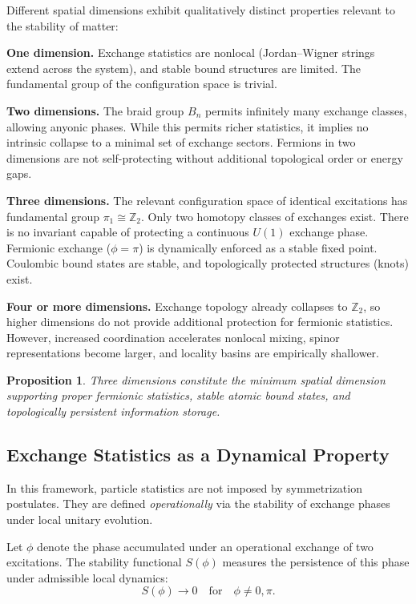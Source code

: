 \documentclass[11pt]{article}
\newtheorem{proposition}{Proposition}
\begin{document}
Different spatial dimensions exhibit qualitatively distinct properties relevant to the stability of matter:

\textbf{One dimension.} Exchange statistics are nonlocal (Jordan--Wigner strings extend across the system), and stable bound structures are limited. The fundamental group of the configuration space is trivial.

\textbf{Two dimensions.} The braid group $B_n$ permits infinitely many exchange classes, allowing anyonic phases. While this permits richer statistics, it implies no intrinsic collapse to a minimal set of exchange sectors. Fermions in two dimensions are not self-protecting without additional topological order or energy gaps.

\textbf{Three dimensions.} The relevant configuration space of identical excitations has fundamental group $\pi_1 \cong \mathbb{Z}_2$. Only two homotopy classes of exchanges exist. There is no invariant capable of protecting a continuous $U(1)$ exchange phase. Fermionic exchange ($\phi = \pi$) is dynamically enforced as a stable fixed point. Coulombic bound states are stable, and topologically protected structures (knots) exist.

\textbf{Four or more dimensions.} Exchange topology already collapses to $\mathbb{Z}_2$, so higher dimensions do not provide additional protection for fermionic statistics. However, increased coordination accelerates nonlocal mixing, spinor representations become larger, and locality basins are empirically shallower.

\begin{proposition}
Three dimensions constitute the minimum spatial dimension supporting proper fermionic statistics, stable atomic bound states, and topologically persistent information storage.
\end{proposition}

\subsection{Exchange Statistics as a Dynamical Property}

In this framework, particle statistics are not imposed by symmetrization postulates. They are defined \emph{operationally} via the stability of exchange phases under local unitary evolution.

Let $\phi$ denote the phase accumulated under an operational exchange of two excitations. The stability functional $S(\phi)$ measures the persistence of this phase under admissible local dynamics:
\begin{equation}
S(\phi) \to 0 \quad \text{for} \quad \phi \neq 0, \pi.
\end{equation}
\end{document}
